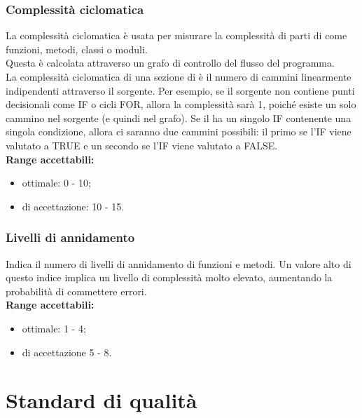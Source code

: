 \documentclass{scalatekids-article}
\begin{document}
\subsubsection{Complessità ciclomatica}
La complessità ciclomatica è usata per misurare la complessità di parti di  come funzioni, metodi, classi o moduli.\\
Questa è calcolata attraverso un grafo di controllo del flusso del programma.\\La complessità ciclomatica di una sezione di  è il numero di cammini linearmente indipendenti attraverso il  sorgente. Per esempio, se il  sorgente non contiene punti decisionali come IF o cicli FOR, allora la complessità sarà 1, poiché esiste un solo cammino nel sorgente (e quindi nel grafo). Se il  ha un singolo IF contenente una singola condizione, allora ci saranno due cammini possibili: il primo se l'IF viene valutato a TRUE e un secondo se l'IF viene valutato a FALSE.\\
\textbf{Range accettabili:}
\begin{itemize}
  \item {} ottimale: 0 - 10;
  \item {} di accettazione: 10 - 15.
\end{itemize}
\subsubsection{Livelli di annidamento}
Indica il numero di livelli di annidamento di funzioni e metodi. Un valore alto di questo indice implica un livello di complessità molto elevato, aumentando la probabilità di commettere errori.\\
\textbf{Range accettabili:}
\begin{itemize}
  \item {} ottimale: 1 - 4;
  \item {} di accettazione 5 - 8.
\end{itemize}
\newpage
\appendix
\section{Standard di qualità}
\end{document}
